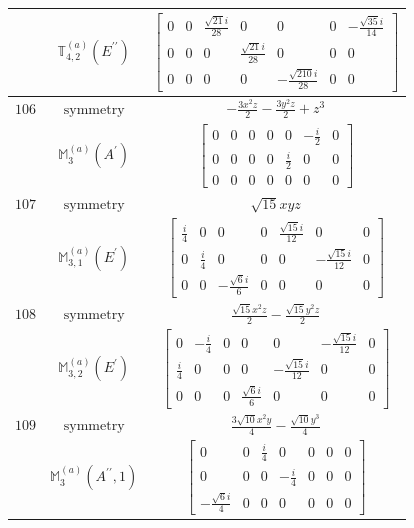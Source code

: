 \documentclass[fleqn,8pt,landscape]{jsarticle}
\begin{document}
\begin{longtable}{ccc}
$  $ & $ \mathbb{T}_{4,2}^{(a)}(E^{\prime\prime}) $ & $ \begin{bmatrix} 0 & 0 & \frac{\sqrt{21} i}{28} & 0 & 0 & 0 & - \frac{\sqrt{35} i}{14} \\ 0 & 0 & 0 & \frac{\sqrt{21} i}{28} & 0 & 0 & 0 \\ 0 & 0 & 0 & 0 & - \frac{\sqrt{210} i}{28} & 0 & 0 \end{bmatrix} $ \\ \hline
$ 106 $ & $ \text{symmetry} $ & $ - \frac{3 x^{2} z}{2} - \frac{3 y^{2} z}{2} + z^{3} $ \\
$  $ & $ \mathbb{M}_{3}^{(a)}(A^{\prime}) $ & $ \begin{bmatrix} 0 & 0 & 0 & 0 & 0 & - \frac{i}{2} & 0 \\ 0 & 0 & 0 & 0 & \frac{i}{2} & 0 & 0 \\ 0 & 0 & 0 & 0 & 0 & 0 & 0 \end{bmatrix} $ \\ \hline
$ 107 $ & $ \text{symmetry} $ & $ \sqrt{15} x y z $ \\
$  $ & $ \mathbb{M}_{3,1}^{(a)}(E^{\prime}) $ & $ \begin{bmatrix} \frac{i}{4} & 0 & 0 & 0 & \frac{\sqrt{15} i}{12} & 0 & 0 \\ 0 & \frac{i}{4} & 0 & 0 & 0 & - \frac{\sqrt{15} i}{12} & 0 \\ 0 & 0 & - \frac{\sqrt{6} i}{6} & 0 & 0 & 0 & 0 \end{bmatrix} $ \\ \hline
$ 108 $ & $ \text{symmetry} $ & $ \frac{\sqrt{15} x^{2} z}{2} - \frac{\sqrt{15} y^{2} z}{2} $ \\
$  $ & $ \mathbb{M}_{3,2}^{(a)}(E^{\prime}) $ & $ \begin{bmatrix} 0 & - \frac{i}{4} & 0 & 0 & 0 & - \frac{\sqrt{15} i}{12} & 0 \\ \frac{i}{4} & 0 & 0 & 0 & - \frac{\sqrt{15} i}{12} & 0 & 0 \\ 0 & 0 & 0 & \frac{\sqrt{6} i}{6} & 0 & 0 & 0 \end{bmatrix} $ \\ \hline
$ 109 $ & $ \text{symmetry} $ & $ \frac{3 \sqrt{10} x^{2} y}{4} - \frac{\sqrt{10} y^{3}}{4} $ \\
$  $ & $ \mathbb{M}_{3}^{(a)}(A^{\prime\prime},1) $ & $ \begin{bmatrix} 0 & 0 & \frac{i}{4} & 0 & 0 & 0 & 0 \\ 0 & 0 & 0 & - \frac{i}{4} & 0 & 0 & 0 \\ - \frac{\sqrt{6} i}{4} & 0 & 0 & 0 & 0 & 0 & 0 \end{bmatrix} $ \\ \hline

\end{longtable}
\end{document}
